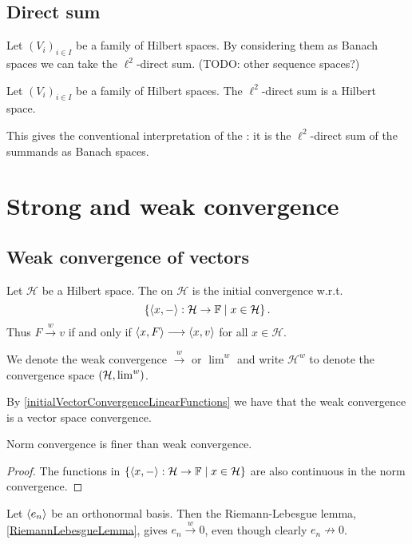 \subsection{Direct sum}
Let $(V_i)_{i\in I}$ be a family of Hilbert spaces. By considering them as Banach spaces we can take the $\ell^2$-direct sum. (TODO: other sequence spaces?)
\begin{proposition}
Let $(V_i)_{i\in I}$ be a family of Hilbert spaces. The $\ell^2$-direct sum is a Hilbert space.
\end{proposition}
This gives the conventional interpretation of the : it is the $\ell^2$-direct sum of the summands as Banach spaces.

\section{Strong and weak convergence}
\subsection{Weak convergence of vectors}
\begin{definition}
Let $\mathcal{H}$ be a Hilbert space. The  on $\mathcal{H}$ is the initial convergence w.r.t.
\[ \left\{ \left\langle x,- \right\rangle: \mathcal{H}\to \mathbb{F} \;\middle|\; x\in\mathcal{H} \right\}. \]
Thus $F \overset{w}{\longrightarrow} v$ \textup{if and only if} $\left\langle x, F \right\rangle \longrightarrow \left\langle x,v \right\rangle$ for all $x\in\mathcal{H}$.

We denote the weak convergence $\overset{w}{\longrightarrow}$ or $\lim^w$ and write $\mathcal{H}^w$ to denote the convergence space $\left( \mathcal{H},\lim^w \right)$.
\end{definition}
By \ref{initialVectorConvergenceLinearFunctions} we have that the weak convergence is a vector space convergence.

\begin{lemma} \label{normConvergenceFinerThenWeakConvergence}
Norm convergence is finer than weak convergence.
\end{lemma}
\begin{proof}
The functions in $\left\{ \left\langle x,- \right\rangle: \mathcal{H}\to \mathbb{F} \;\middle|\; x\in\mathcal{H} \right\}$ are also continuous in the norm convergence.
\end{proof}

\begin{example}
Let $\left\langle e_n \right\rangle$ be an orthonormal basis. Then the Riemann-Lebesgue lemma, \ref{RiemannLebesgueLemma}, gives $e_n \overset{w}{\longrightarrow} 0$, even though clearly $e_n \not\to 0$.
\end{example}

